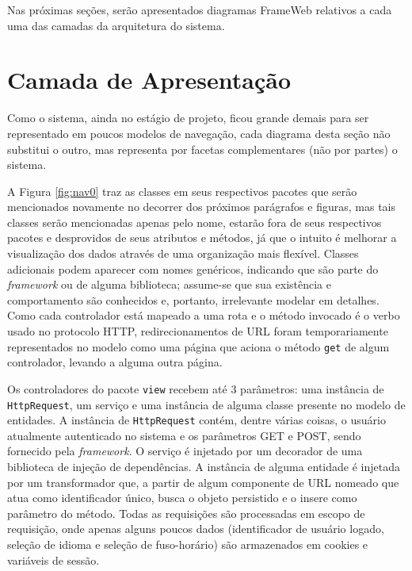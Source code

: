 Nas próximas seções, serão apresentados diagramas FrameWeb relativos a cada uma das camadas da arquitetura do sistema.

\section{Camada de Apresentação}
\label{sec-arquitetura-apresentacao}


Como o sistema, ainda no estágio de projeto, ficou grande demais para ser representado em poucos modelos de navegação, cada diagrama desta seção não substitui o outro, mas representa por facetas complementares (não por partes) o sistema.

A Figura \ref{fig:nav0} traz as classes em seus respectivos pacotes que serão mencionados novamente no decorrer dos próximos parágrafos e figuras, mas tais classes serão mencionadas apenas pelo nome, estarão fora de seus respectivos pacotes e desprovidos de seus atributos e métodos, já que o intuito é melhorar a visualização dos dados através de uma organização mais flexível. Classes adicionais podem aparecer com nomes genéricos, indicando que são parte do \textit{framework} ou de alguma biblioteca; assume-se que sua existência e comportamento são conhecidos e, portanto, irrelevante modelar em detalhes. Como cada controlador está mapeado a uma rota e o método invocado é o verbo usado no protocolo HTTP, redirecionamentos de URL foram temporariamente representados no modelo como uma página que aciona o método \texttt{get} de algum controlador, levando a alguma outra página.

Os controladores do pacote \texttt{view} recebem até 3 parâmetros: uma instância de \texttt{HttpRequest}, um serviço e uma instância de alguma classe presente no modelo de entidades. A instância de \texttt{HttpRequest} contém, dentre várias coisas, o usuário atualmente autenticado no sistema e os parâmetros GET e POST, sendo fornecido pela \textit{framework}. O serviço é injetado por um decorador de uma biblioteca de injeção de dependências. A instância de alguma entidade é injetada por um transformador que, a partir de algum componente de URL nomeado que atua como identificador único, busca o objeto persistido e o insere como parâmetro do método. Todas as requisições são processadas em escopo de requisição, onde apenas alguns poucos dados (identificador de usuário logado, seleção de idioma e seleção de fuso-horário) são armazenados em cookies e variáveis de sessão.

